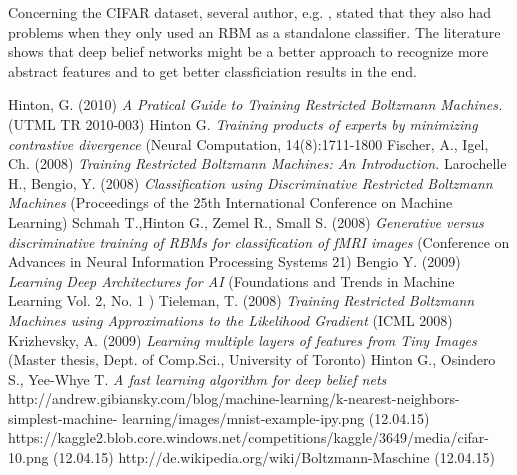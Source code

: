 \documentclass[a4paper]{scrartcl}
\begin{document}
\par Concerning the CIFAR dataset, several author, e.g. \cite{Krizhevsky}, stated that they also had problems when they only used an RBM as a standalone classifier. The literature shows that deep belief networks might be a better approach to recognize more abstract features and to get better classficiation results in the end.

\newpage

\begin{thebibliography}{9}
    Hinton, G. (2010) \emph{A Pratical Guide to Training Restricted 			Boltzmann Machines.} (UTML TR 2010-003)
    Hinton G. \emph{Training products of experts by minimizing contrastive divergence} (Neural Computation, 14(8):1711-1800
    Fischer, A., Igel, Ch. (2008) \emph{Training Restricted Boltzmann 		Machines: An Introduction.} 
    Larochelle H., Bengio, Y. (2008) \emph {Classification using 			Discriminative Restricted Boltzmann Machines} (Proceedings of the 25th International 			Conference on Machine Learning)
    Schmah T.,Hinton G., Zemel R., Small S. (2008) \emph{Generative 			versus discriminative training of RBMs
	for classification of fMRI images} (Conference on Advances in Neural Information Processing Systems 21)
    Bengio Y. (2009) \emph {Learning Deep Architectures for AI} (Foundations and Trends in Machine Learning
	Vol. 2, No. 1 )
    Tieleman, T. (2008) \emph{Training Restricted Boltzmann Machines using Approximations to
	the Likelihood Gradient} (ICML 2008)
	 Krizhevsky, A. (2009) \emph{Learning multiple layers of features from Tiny Images} (Master thesis, Dept. of Comp.Sci., University of 	Toronto)	
    Hinton G., Osindero S., Yee-Whye T. \emph {A fast learning 			algorithm for deep belief nets}
    http://andrew.gibiansky.com/blog/machine-learning/k-nearest-neighbors-simplest-machine- learning/images/mnist-example-ipy.png (12.04.15)
    https://kaggle2.blob.core.windows.net/competitions/kaggle/3649/media/cifar-10.png (12.04.15)
    http://de.wikipedia.org/wiki/Boltzmann-Maschine (12.04.15)
\end{thebibliography}
\end{document}
